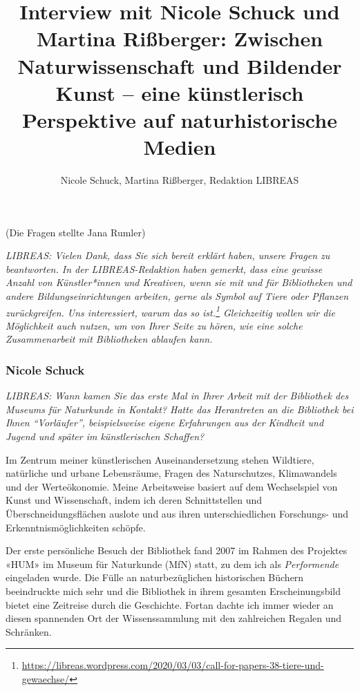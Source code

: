 \documentclass[a4paper,
fontsize=11pt,
oneside,
numbers=noperiodatend,
parskip=half-,
bibliography=totoc,
final
]{scrartcl}
\title{\LARGE{Interview mit Nicole Schuck und Martina Rißberger: Zwischen Naturwissenschaft und Bildender Kunst – eine künstlerisch Perspektive auf naturhistorische Medien}}%
\author{Nicole Schuck, Martina Rißberger, Redaktion LIBREAS} %
\date{}
\begin{document}
\maketitle
\thispagestyle{fancyplain} 


(Die Fragen stellte Jana Rumler)

\emph{LIBREAS: Vielen Dank, dass Sie sich bereit erklärt haben, unsere
Fragen zu beantworten. In der LIBREAS-Redaktion haben gemerkt, dass eine
gewisse Anzahl von Künstler*innen und Kreativen, wenn sie mit und für
Bibliotheken und andere Bildungseinrichtungen arbeiten, gerne als Symbol
auf Tiere oder Pflanzen zurückgreifen. Uns interessiert, warum das so
ist.\footnote{\url{https://libreas.wordpress.com/2020/03/03/call-for-papers-38-tiere-und-gewaechse/}}
Gleichzeitig wollen wir die Möglichkeit auch nutzen, um von Ihrer Seite
zu hören, wie eine solche Zusammenarbeit mit Bibliotheken ablaufen
kann.}

\hypertarget{nicole-schuck}{%
\subsubsection{Nicole Schuck}\label{nicole-schuck}}

\emph{LIBREAS: Wann kamen Sie das erste Mal in Ihrer Arbeit mit der
Bibliothek des Museums für Naturkunde in Kontakt? Hatte das Herantreten
an die Bibliothek bei Ihnen \enquote{Vorläufer}, beispielsweise eigene
Erfahrungen aus der Kindheit und Jugend und später im künstlerischen
Schaffen?}

Im Zentrum meiner künstlerischen Auseinandersetzung stehen Wildtiere,
natürliche und urbane Lebensräume, Fragen des Naturschutzes,
Klimawandels und der Werteökonomie. Meine Arbeitsweise basiert auf dem
Wechselspiel von Kunst und Wissenschaft, indem ich deren Schnittstellen
und Überschneidungsflächen auslote und aus ihren unterschiedlichen
Forschungs- und Erkenntnismöglichkeiten schöpfe.

Der erste persönliche Besuch der Bibliothek fand 2007 im Rahmen des
Projektes «HUM» im Museum für Naturkunde (MfN) statt, zu dem ich als
\emph{Performende} eingeladen wurde. Die Fülle an naturbezüglichen
historischen Büchern beeindruckte mich sehr und die Bibliothek in ihrem
gesamten Erscheinungsbild bietet eine Zeitreise durch die Geschichte.
Fortan dachte ich immer wieder an diesen spannenden Ort der
Wissenssammlung mit den zahlreichen Regalen und Schränken.
\end{document}
